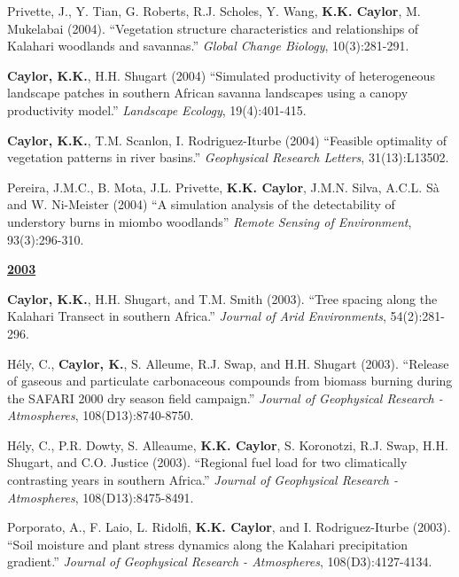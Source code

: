 \documentclass[10pt]{report}
\begin{document}
\begin{etaremune}
\item Privette, J., Y. Tian, G. Roberts, R.J. Scholes, Y. Wang, \textbf{K.K. Caylor}, M. Mukelabai (2004). ``Vegetation structure characteristics and relationships of Kalahari woodlands and savannas.'' \emph{Global Change Biology}, 10(3):281-291.

\item \textbf{Caylor, K.K.}, H.H. Shugart (2004) ``Simulated productivity of heterogeneous landscape patches in southern African savanna landscapes using a canopy productivity model.'' \emph{Landscape Ecology}, 19(4):401-415.

\item \textbf{Caylor, K.K.}, T.M. Scanlon, I. Rodriguez-Iturbe (2004) ``Feasible optimality of vegetation patterns in river basins.'' \emph{Geophysical Research Letters}, 31(13):L13502.

\item Pereira, J.M.C., B. Mota, J.L. Privette, \textbf{K.K. Caylor}, J.M.N. Silva, A.C.L. S\`a and W. Ni-Meister (2004) ``A simulation analysis of the detectability of understory burns in miombo woodlands'' \emph{Remote Sensing of Environment}, 93(3):296-310.

\underline{\textbf{2003}}

\item \textbf{Caylor, K.K.}, H.H. Shugart, and T.M. Smith (2003). ``Tree spacing along the Kalahari Transect in southern Africa.'' \emph{Journal of Arid Environments}, 54(2):281-296.

\item H\'ely, C., \textbf{Caylor, K.}, S. Alleume, R.J. Swap, and H.H. Shugart (2003). ``Release of gaseous and particulate carbonaceous compounds from biomass burning during the SAFARI 2000 dry season field campaign.'' \emph{Journal of Geophysical Research - Atmospheres}, 108(D13):8740-8750.

\item H\'ely, C., P.R. Dowty, S. Alleaume, \textbf{K.K. Caylor}, S. Koronotzi, R.J. Swap, H.H. Shugart, and C.O. Justice (2003). ``Regional fuel load for two climatically contrasting years in southern Africa.'' \emph{Journal of Geophysical Research - Atmospheres}, 108(D13):8475-8491.

\item Porporato, A., F. Laio, L. Ridolfi, \textbf{K.K. Caylor}, and I. Rodriguez-Iturbe (2003). ``Soil moisture and plant stress dynamics along the Kalahari precipitation gradient.'' \emph{Journal of Geophysical Research - Atmospheres}, 108(D3):4127-4134.



\end{etaremune}
\end{document}
